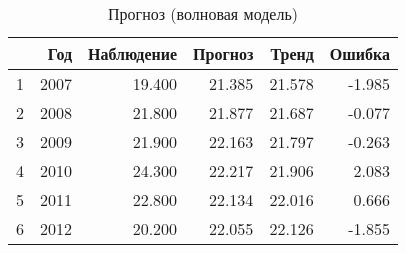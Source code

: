 \begin{table}[ht]
\centering
\begin{tabular}{rrrrrr}
  \hline
 & Год & Наблюдение & Прогноз & Тренд & Ошибка \\ 
  \hline
1 & 2007 & 19.400 & 21.385 & 21.578 & -1.985 \\ 
  2 & 2008 & 21.800 & 21.877 & 21.687 & -0.077 \\ 
  3 & 2009 & 21.900 & 22.163 & 21.797 & -0.263 \\ 
  4 & 2010 & 24.300 & 22.217 & 21.906 & 2.083 \\ 
  5 & 2011 & 22.800 & 22.134 & 22.016 & 0.666 \\ 
  6 & 2012 & 20.200 & 22.055 & 22.126 & -1.855 \\ 
   \hline
\end{tabular}
\caption{Прогноз (волновая модель)} 
\label{table:auto-rob-5-prediction}
\end{table}
